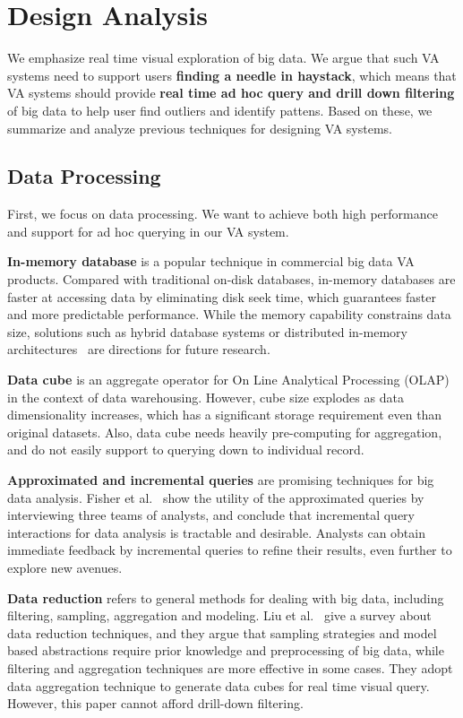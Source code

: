 \documentclass[journal]{vgtc}                %
\begin{document}
{%
\section{Design Analysis}
We emphasize real time visual exploration of big data. 
We argue that such VA systems need to support users \textbf{finding a needle in haystack}, which means that VA systems should provide \textbf{real time ad hoc query and drill down filtering} of big data to help user find outliers and identify pattens. Based on these, we summarize and analyze previous techniques for designing VA systems.

\subsection{Data Processing}
First, we focus on data processing. We want to achieve both high performance and support for ad hoc querying in our VA system.  
 
\textbf{In-memory database} is a popular technique in commercial big data VA products. Compared with traditional on-disk databases, in-memory databases are faster at accessing data by eliminating disk seek time, which guarantees faster and more predictable performance. While the memory capability constrains  data size, solutions such as hybrid database systems or distributed in-memory architectures~\cite{Kallman:2008}  are directions for future research.  

\textbf{Data cube} is an aggregate operator for On Line Analytical Processing (OLAP) in the context of data warehousing. However, cube size explodes as data dimensionality increases, which has a significant storage requirement even than original datasets. Also, data cube needs heavily pre-computing for aggregation, and do not easily support to querying down to individual record.

\textbf{Approximated and incremental queries} are promising techniques for big data analysis. Fisher et al.~\cite{FisherCHI2012} show the utility of the approximated queries by interviewing three teams of analysts,  and  conclude that incremental query interactions for data analysis is tractable and desirable. Analysts can obtain immediate feedback by incremental queries to refine their results, even further to explore new avenues.  

\textbf{Data reduction} refers to general methods for dealing with big data, including filtering, sampling, aggregation and modeling. Liu et al.~\cite{2013-immens} give a survey about data reduction techniques, and they argue that sampling strategies and model based abstractions require prior knowledge and preprocessing of big data, while filtering and aggregation techniques are more effective in some cases. They adopt data aggregation technique to generate data cubes for real time visual query. However, this paper cannot afford drill-down filtering.

}
\end{document}
